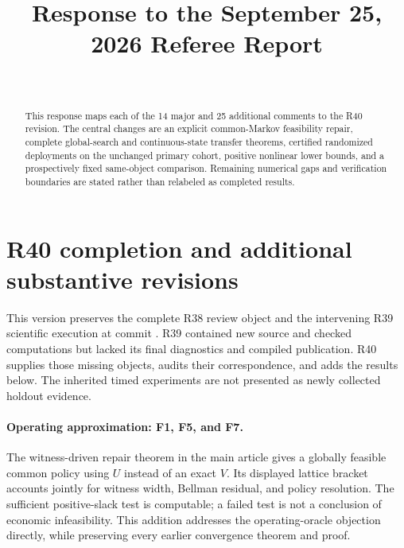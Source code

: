 


\begin{frontmatter}
\title{Response to the September 25, 2026 Referee Report}
\begin{aug}\author[id=au1,addressref={add1}]{~}\address[id=add1]{}\end{aug}
\begin{abstract}This response maps each of the 14 major and 25 additional comments to the R40 revision. The central changes are an explicit common-Markov feasibility repair, complete global-search and continuous-state transfer theorems, certified randomized deployments on the unchanged primary cohort, positive nonlinear lower bounds, and a prospectively fixed same-object comparison. Remaining numerical gaps and verification boundaries are stated rather than relabeled as completed results.\end{abstract}
\end{frontmatter}

\section{R40 completion and additional substantive revisions}
This version preserves the complete R38 review object and the intervening R39 scientific execution at commit . R39 contained new source and checked computations but lacked its final diagnostics and compiled publication. R40 supplies those missing objects, audits their correspondence, and adds the results below. The inherited timed experiments are not presented as newly collected holdout evidence.

\paragraph{Operating approximation: F1, F5, and F7.} The witness-driven repair theorem in the main article gives a globally feasible common policy using $U$ instead of an exact $V$. Its displayed lattice bracket accounts jointly for witness width, Bellman residual, and policy resolution. The sufficient positive-slack test is computable; a failed test is not a conclusion of economic infeasibility. This addition addresses the operating-oracle objection directly, while preserving every earlier convergence theorem and proof.

